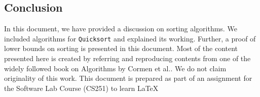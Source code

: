 \documentclass[10pt]{article}
\begin{document}
\begin{multicols*}{2}
\vspace{3.5em}
\section{Conclusion}
In this document, we have provided a discussion
on sorting algorithms. We included algorithms for
\texttt{Quicksort} and explained its working. Further, a
proof of lower bounds on sorting is presented in this
document. Most of the content presented here is
created by referring and reproducing contents from
one of the widely followed book on Algorithms by
Cormen et al.\cite{cormen2009introduction}. We do not claim originality of this work. This document is prepared as part of an
assignment for the Software Lab Course (CS251) to
learn \LaTeX



\end{multicols*}
\end{document}
